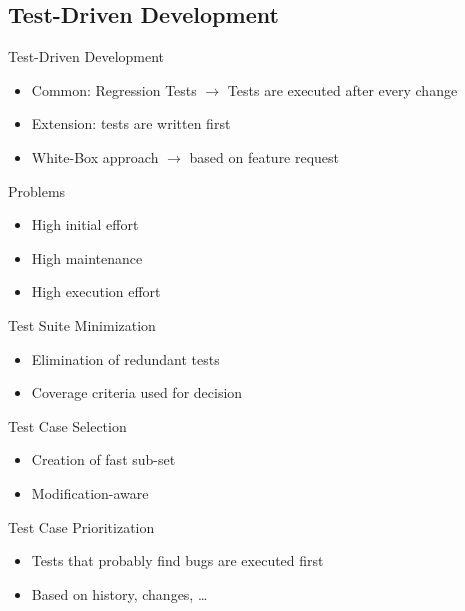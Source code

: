 \subsection{Test-Driven Development}
\begin{frame}{\insertsubsection}
	\begin{fancycolumns}[animation=none]
		\begin{definition}{Test-Driven Development}
			\begin{itemize}
				\item Common: Regression Tests $\rightarrow$ Tests are executed after every change
				\item Extension: tests are written first
				\item White-Box approach $\rightarrow$ based on feature request
			\end{itemize}
		\end{definition} \pause
		\begin{note}{Problems}
			\begin{itemize}
				\item High initial effort
				\item High maintenance
				\item High execution effort
			\end{itemize}
		\end{note} \pause
		\nextcolumn
		\begin{note}{Test Suite Minimization}
			\begin{itemize}
				\item Elimination of redundant tests
				\item Coverage criteria used for decision
			\end{itemize}
		\end{note} \pause
		\begin{note}{Test Case Selection}
			\begin{itemize}
				\item Creation of fast sub-set 
				\item Modification-aware
			\end{itemize}
		\end{note} \pause
		\begin{note}{Test Case Prioritization}
			\begin{itemize}
				\item Tests that probably find bugs are executed first
				\item Based on history, changes, \dots
			\end{itemize}
		\end{note} 
	\end{fancycolumns}
\end{frame}

